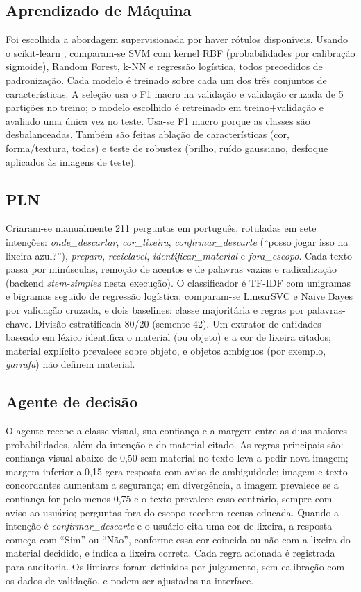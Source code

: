 \documentclass[conference]{IEEEtran}
\begin{document}
\subsection{Aprendizado de Máquina}
Foi escolhida a abordagem supervisionada por haver rótulos disponíveis. Usando o scikit-learn \cite{sklearn}, comparam-se SVM com kernel RBF (probabilidades por calibração sigmoide), Random Forest, k-NN e regressão logística, todos precedidos de padronização. Cada modelo é treinado sobre cada um dos três conjuntos de características. A seleção usa o F1 macro na validação e validação cruzada de 5 partições no treino; o modelo escolhido é retreinado em treino+validação e avaliado uma única vez no teste. Usa-se F1 macro porque as classes são desbalanceadas. Também são feitas ablação de características (cor, forma/textura, todas) e teste de robustez (brilho, ruído gaussiano, desfoque aplicados às imagens de teste).

\subsection{PLN}
Criaram-se manualmente 211 perguntas em português, rotuladas em sete intenções: \emph{onde\_descartar}, \emph{cor\_lixeira}, \emph{confirmar\_descarte} (``posso jogar isso na lixeira azul?''), \emph{preparo}, \emph{reciclavel}, \emph{identificar\_material} e \emph{fora\_escopo}. Cada texto passa por minúsculas, remoção de acentos e de palavras vazias e radicalização (backend \emph{stem-simples} nesta execução). O classificador é TF-IDF com unigramas e bigramas seguido de regressão logística; comparam-se LinearSVC e Naive Bayes por validação cruzada, e dois baselines: classe majoritária e regras por palavras-chave. Divisão estratificada 80/20 (semente 42). Um extrator de entidades baseado em léxico identifica o material (ou objeto) e a cor de lixeira citados; material explícito prevalece sobre objeto, e objetos ambíguos (por exemplo, \emph{garrafa}) não definem material.

\subsection{Agente de decisão}
O agente recebe a classe visual, sua confiança e a margem entre as duas maiores probabilidades, além da intenção e do material citado. As regras principais são: confiança visual abaixo de 0,50 sem material no texto leva a pedir nova imagem; margem inferior a 0,15 gera resposta com aviso de ambiguidade; imagem e texto concordantes aumentam a segurança; em divergência, a imagem prevalece se a confiança for pelo menos 0,75 e o texto prevalece caso contrário, sempre com aviso ao usuário; perguntas fora do escopo recebem recusa educada. Quando a intenção é \emph{confirmar\_descarte} e o usuário cita uma cor de lixeira, a resposta começa com ``Sim'' ou ``Não'', conforme essa cor coincida ou não com a lixeira do material decidido, e indica a lixeira correta. Cada regra acionada é registrada para auditoria. Os limiares foram definidos por julgamento, sem calibração com os dados de validação, e podem ser ajustados na interface.
\end{document}

